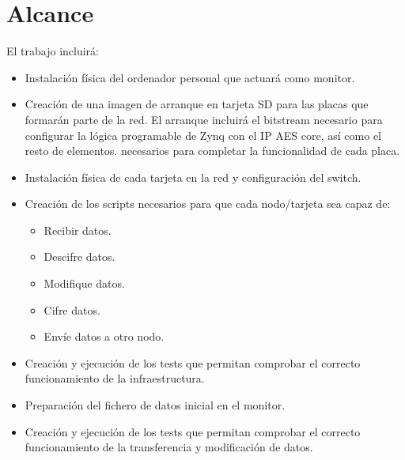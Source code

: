 \chapter{Alcance}
El trabajo incluirá:
\begin{itemize}
	\item Instalación física del ordenador personal que actuará como monitor.
	\item Creación de una imagen de arranque en tarjeta SD para las placas que formarán parte de la red. El arranque incluirá el bitstream necesario para configurar la lógica programable de Zynq con el IP AES core, así como el resto de elementos.
	necesarios para completar la funcionalidad de cada placa.
	\item Instalación física de cada tarjeta en la red y configuración del switch.
	\item Creación de los scripts necesarios para que cada nodo/tarjeta sea capaz de:
	\begin{itemize}
		\item Recibir datos.
		\item Descifre datos.
		\item Modifique datos.
		\item Cifre datos.
		\item Envíe datos a otro nodo.
	\end{itemize}
	\item Creación y ejecución de los tests que permitan comprobar el correcto funcionamiento de la infraestructura.
	\item Preparación del fichero de datos inicial en el monitor.
	\item Creación y ejecución de los tests que permitan comprobar el correcto funcionamiento de la transferencia y modificación de datos.
\end{itemize}